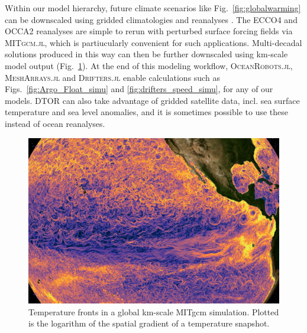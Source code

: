\documentclass{juliacon}[12pt]
\newcommand{\pkg}[1]{{\small \textsc{#1}}}
\begin{document}
Within our model hierarchy, future climate scenarios like Fig.~\ref{fig:globalwarming} can be downscaled using gridded climatologies and reanalyses \cite{Forget2010,Forget2015a,Forget2024a}. The ECCO4 and OCCA2 reanalyses are simple to rerun with perturbed surface forcing fields via \pkg{MITgcm.jl}, which is partiucularly convenient for such applications. Multi-decadal solutions produced in this way can then be further downscaled using km-scale model output (Fig.~\ref{fig:km_scale}). At the end of this modeling workflow, \pkg{OceanRobots.jl}, \pkg{MeshArrays.jl} and \pkg{Drifters.jl} enable calculations such as Figs.~\ref{fig:Argo_Float_simu} and \ref{fig:drifters_speed_simu}, for any of our models. DTOR can also take advantage of gridded satellite data, incl. sea surface temperature and sea level anomalies, and it is sometimes possible to use these instead of ocean reanalyses.

\begin{figure}[th]
\centerline{\includegraphics[width=\columnwidth]{figs/Snapshot_grad_theta.png}}
\caption{Temperature fronts in a global km-scale MITgcm simulation. Plotted is the logarithm of the spatial gradient of a temperature snapshot.}
\label{fig:km_scale}
\end{figure}
\end{document}
